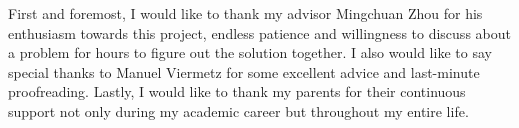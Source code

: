 \vspace{1cm}
First and foremost, I would like to thank my advisor Mingchuan Zhou for his enthusiasm towards this project, endless patience and  willingness to discuss about a problem for hours to figure out the solution together. I also would like to say special thanks to Manuel Viermetz for some excellent advice and last-minute proofreading. Lastly, I would like to thank my parents for their continuous support not only during my academic career but throughout my entire life. 